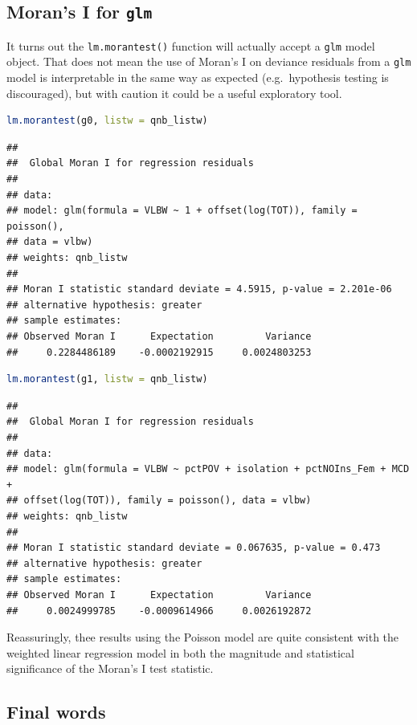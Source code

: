 \documentclass[
]{book}
\newcommand{\passthrough}[1]{#1}
\begin{document}
\hypertarget{morans-i-for-glm}{%
\subsection{\texorpdfstring{Moran's I for \texttt{glm}}{Moran's I for glm}}\label{morans-i-for-glm}}

It turns out the \passthrough{\lstinline!lm.morantest()!} function will actually accept a \passthrough{\lstinline!glm!} model object. That does not mean the use of Moran's I on deviance residuals from a \passthrough{\lstinline!glm!} model is interpretable in the same way as expected (e.g.~hypothesis testing is discouraged), but with caution it could be a useful exploratory tool.

\begin{lstlisting}[language=R]
lm.morantest(g0, listw = qnb_listw)
\end{lstlisting}

\begin{lstlisting}
## 
## 	Global Moran I for regression residuals
## 
## data:  
## model: glm(formula = VLBW ~ 1 + offset(log(TOT)), family = poisson(),
## data = vlbw)
## weights: qnb_listw
## 
## Moran I statistic standard deviate = 4.5915, p-value = 2.201e-06
## alternative hypothesis: greater
## sample estimates:
## Observed Moran I      Expectation         Variance 
##     0.2284486189    -0.0002192915     0.0024803253
\end{lstlisting}

\begin{lstlisting}[language=R]
lm.morantest(g1, listw = qnb_listw)
\end{lstlisting}

\begin{lstlisting}
## 
## 	Global Moran I for regression residuals
## 
## data:  
## model: glm(formula = VLBW ~ pctPOV + isolation + pctNOIns_Fem + MCD +
## offset(log(TOT)), family = poisson(), data = vlbw)
## weights: qnb_listw
## 
## Moran I statistic standard deviate = 0.067635, p-value = 0.473
## alternative hypothesis: greater
## sample estimates:
## Observed Moran I      Expectation         Variance 
##     0.0024999785    -0.0009614966     0.0026192872
\end{lstlisting}

Reassuringly, thee results using the Poisson model are quite consistent with the weighted linear regression model in both the magnitude and statistical significance of the Moran's I test statistic.

\hypertarget{final-words}{%
\subsection{Final words}\label{final-words}}
\end{document}
